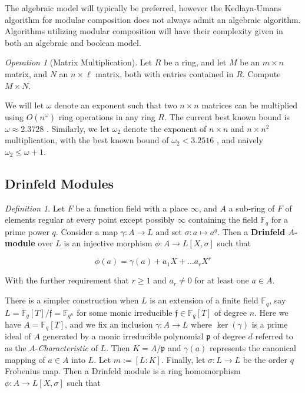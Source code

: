 \documentclass{acmart}
\theoremstyle{remark}
\numberwithin{equation}{section}
\newtheorem{definition}{Definition}
\newtheorem{operation}{Operation}
\newcommand{\frakf}{\mathfrak{f}}
\begin{document}
The algebraic model will typically be preferred, however the Kedlaya-Umans algorithm for modular composition does not always admit an algebraic algorithm. Algorithms utilizing modular composition will have their complexity given in both an algebraic and boolean model.

\begin{operation}[Matrix Multiplication]

Let $R$ be a ring, and let $M$ be an $m\times n$ matrix, and $N$ an $n \times \ell$ matrix, both with entries contained in $R$. Compute $M\times N$.

\end{operation}

We will let $\omega$ denote an exponent such that two $n\times n$ matrices can be multiplied using $O(n^{\omega})$ ring operations in any ring $R$. The current best known bound is $\omega \approx 2.3728$ \cite{DBLP:journals/corr/abs-1708-05622}. Similarly, we let $\omega_2$ denote the exponent of $n \times n$ and $n \times n^2$ multiplication, with the best known bound of $\omega_2 < 3.2516$ \cite{DBLP:journals/corr/abs-1708-05622}, and naively $\omega_2 \leq \omega + 1$.

\subsection{Drinfeld Modules}

\begin{definition}

Let $F$ be a function field with a place $\infty$, and $A$ a sub-ring of $F$ of elements regular at every point except possibly $\infty$ containing the field $\mathbb{F}_q$ for a prime power $q$. Consider a map $\gamma : A \to L$ and set $\sigma : a \mapsto a^q$. Then a \textbf{Drinfeld $A$-module} over $L$ is an injective morphism $\phi: A \to L[X,\sigma]$ such that 

\[\phi(a) = \gamma(a) + a_1 X + \ldots a_rX^r \]

\noindent With the further requirement that $r \geq 1 $ and $a_r \neq 0$ for at least one $a \in A$.

\end{definition}

There is a simpler construction when $L$ is an extension of a finite field $\mathbb{F}_q$, say $L = \mathbb{F}_q[T]/\mathfrak{f} = \mathbb{F}_{q^n}$ for some monic irreducible  $\frakf \in \mathbb{F}_q[T]$ of degree $n$. Here we have $A = \mathbb{F}_{q}[T]$, and we fix an inclusion $\gamma: A \to L$ where $\ker(\gamma)$ is a prime ideal of $A$ generated by a monic irreducible polynomial $\mathfrak{p}$ of degree $d$ referred to as the $A$-\textit{Characteristic} of $L$. Then $K = A/\mathfrak{p}$ and $\gamma(a)$ represents the canonical mapping of $a \in A$ into $L$. Let $m := [L : K]$. Finally, let $\sigma : L \to L$ be the order $q$ Frobenius map. Then a Drinfeld module is a ring homomorphism $\phi: A \to L[X,\sigma]$ such that 
\end{document}
